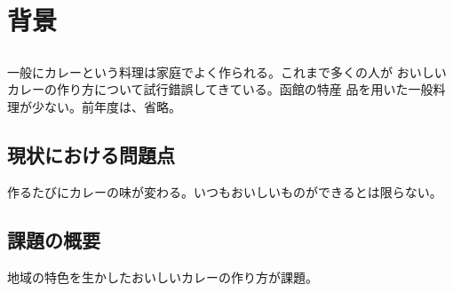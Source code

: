 \chapter{背景}


\section{}

一般にカレーという料理は家庭でよく作られる。これまで多くの人が
おいしいカレーの作り方について試行錯誤してきている。函館の特産
品を用いた一般料理が少ない。前年度は、省略。

\section{現状における問題点}
作るたびにカレーの味が変わる。いつもおいしいものができるとは限らない。

\section{課題の概要}\label{sec:gaiyou}
地域の特色を生かしたおいしいカレーの作り方が課題。

